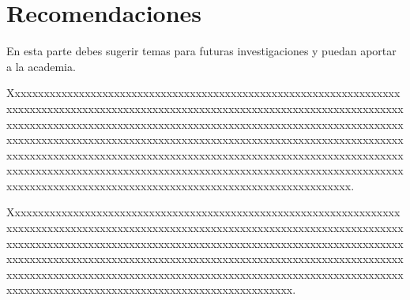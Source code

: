 \chapter*{Recomendaciones}

En esta parte debes sugerir temas para futuras investigaciones y puedan aportar a la academia.

Xxxxxxxxxxxxxxxxxxxxxxxxxxxxxxxxxxxxxxxxxxxxxxxxxxxxxxxxxxxxxxxxxxxxxxxxxxxxxxxxxxxxxxxxxxxxxxxxxxxxxxxxxxxxxxxxxxxxxxxxxxxxxxxxxxxxxxxxxxxxxxxxxxxxxxxxxxxxxxxxxxxxxxxxxxxxxxxxxxxxxxxxxxxxxxxxxxxxxxxxxxxxxxxxxxxxxxxxxxxxxxxxxxxxxxxxxxxxxxxxxxxxxxxxxxxxxxxxxxxxxxxxxxxxxxxxxxxxxxxxxxxxxxxxxxxxxxxxxxxxxxxxxxxxxxxxxxxxxxxxxxxxxxxxxxxxxxxxxxxxxxxxxxxxxxxxxxxxxxxxxxxxxxxxxxxxxxxxxxxxxxxxxxxxxxxxxxxxxxxxxxxxxxxxxxxxxxxxxxxxxxxxxxxxxxxxxxxxxxxxxxxxxxxxxxxxxxxxxxxxxxxxxx.

Xxxxxxxxxxxxxxxxxxxxxxxxxxxxxxxxxxxxxxxxxxxxxxxxxxxxxxxxxxxxxxxxxxxxxxxxxxxxxxxxxxxxxxxxxxxxxxxxxxxxxxxxxxxxxxxxxxxxxxxxxxxxxxxxxxxxxxxxxxxxxxxxxxxxxxxxxxxxxxxxxxxxxxxxxxxxxxxxxxxxxxxxxxxxxxxxxxxxxxxxxxxxxxxxxxxxxxxxxxxxxxxxxxxxxxxxxxxxxxxxxxxxxxxxxxxxxxxxxxxxxxxxxxxxxxxxxxxxxxxxxxxxxxxxxxxxxxxxxxxxxxxxxxxxxxxxxxxxxxxxxxxxxxxxxxxxxxxxxxxxxxxxxxxxxxxxxxxxxxxxxxxxxxxxxxxxxxxxxxxxxxxxxxxx.